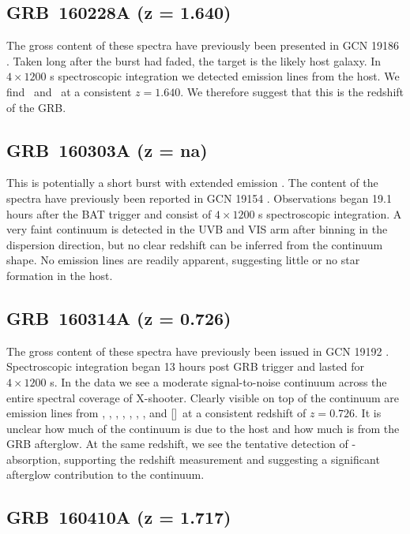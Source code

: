 \documentclass[longauth]{aa}    %
\begin{document}
\subsection{GRB~160228A (z = 1.640)} \label{160228}

The gross content of these spectra have previously been presented in GCN 19186
\citep{GCN19186}. Taken long after the burst had faded, the target is the likely
host galaxy. In $4\times1200$ s spectroscopic integration we detected emission
lines from the host. We find \oiii~and \ha~at a consistent $z = 1.640$.  We
therefore suggest that this is the redshift of the GRB.

\subsection{GRB~160303A (z = na)} \label{160303}

This is potentially a short burst with extended emission \citep[GCN
19148;][]{GCN19148}. The content of the spectra have previously been reported in
GCN 19154 \citep{GCN19154}. Observations began 19.1 hours after the BAT trigger
and consist of $4 \times 1200$ s spectroscopic integration. A very faint
continuum is detected in the UVB and VIS arm after binning in the dispersion
direction, but no clear redshift can be inferred from the continuum shape. No
emission lines are readily apparent, suggesting little or no star formation in
the host.

\subsection{GRB~160314A (z = 0.726)} \label{160314}

The gross content of these spectra have previously been issued in GCN 19192
\citep{GCN19192}. Spectroscopic integration began 13 hours post GRB trigger and
lasted for $4 \times 1200$ s. In the data we see a moderate signal-to-noise
continuum across the entire spectral coverage of X-shooter. Clearly visible on
top of the continuum are emission lines from \oii, \hd, \hg, \hb, \oiii, \ha,
\niil, and [\sii]~at a consistent redshift of $z = 0.726$. It is unclear how much
of the continuum is due to the host and how much is from the GRB afterglow. At
the same redshift, we see the tentative detection of \feii-absorption,
supporting the redshift measurement and suggesting a significant afterglow
contribution to the continuum.

\subsection{GRB~160410A (z = 1.717)}\label{160410}
\end{document}

